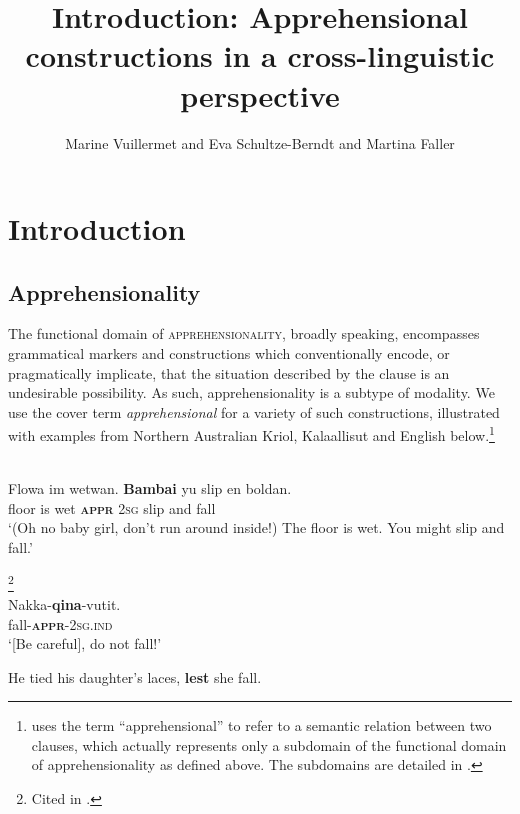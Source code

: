 \documentclass[output=paper,colorlinks,citecolor=brown
]{langscibook}
\author{Marine Vuillermet\orcid{}\affiliation{University of Zürich} and
        Eva Schultze-Berndt\affiliation{The University of Manchester} and
        Martina Faller\orcid{}\affiliation{The University of Manchester}}
\title{Introduction: Apprehensional constructions in a cross-linguistic perspective}
\begin{document}
\maketitle



\section{Introduction}
\label{introintro}

\subsection{Apprehensionality}
\label{subsec:appr}

The functional domain of \textsc{apprehensionality}, broadly speaking, encompasses grammatical markers and constructions which conventionally encode, or pragmatically implicate, that the situation described by the clause is an undesirable possibility. As such, apprehensionality is a subtype of modality. We use the cover term \textit{apprehensional} for a variety of such constructions, illustrated with examples from Northern Australian Kriol, Kalaallisut and English below.\footnote{\citet[1333]{croft2022} uses the term ``apprehensional'' to refer to a semantic relation between two clauses, which actually represents only a subdomain of the functional domain of apprehensionality as defined above. The subdomains are detailed in .}


\ea 
\label{ex:intro1} 
\\
\gll Flowa	im	wetwan.	\textbf{Bambai}	yu	slip	en	boldan. \\
floor is wet \textsc{\textbf{appr}} \textsc{2sg} slip and fall \\
\glt `(Oh no baby girl, don't run around inside!) The floor is wet. You might slip and fall.'
\z

\ea 
\label{ex:intro2} 
\textup{\footnote{Cited in \citet[31]{Dobrushina2006}.}}\\
\gll Nakka-\textbf{qina}-vutit. \\
fall-\textsc{\textbf{appr}-2sg.ind} \\
\glt `[Be careful], do not fall!'
\z

\ea\label{ex:intro3} He tied his daughter's laces, \textbf{lest} she fall.
\z
\end{document}
